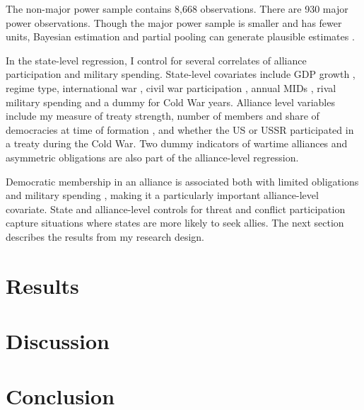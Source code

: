\documentclass[12pt]{article}
\begin{document}
The non-major power sample contains 8,668 observations. 
There are 930 major power observations. 
Though the major power sample is smaller and has fewer units, Bayesian estimation and partial pooling can generate plausible estimates \citep{Stegmueller2013}. 


In the state-level regression, I control for several correlates of alliance participation and military spending. 
State-level covariates include GDP growth \citep{Boltetal2018}, regime type, international war \citep{Reiteretal2016}, civil war participation \citep{SarkeesWayman2010}, annual MIDs \citep{Gibleretal2016}, rival military spending \citep{ThompsonDreyer2012} and a dummy for Cold War years.
Alliance level variables include my measure of treaty strength, number of members and share of democracies at time of formation \citep{Chibaetal2015}, and whether the US or USSR participated in a treaty during the Cold War. 
Two dummy indicators of wartime alliances and asymmetric obligations \citep{Leedsetal2002} are also part of the alliance-level regression. 


Democratic membership in an alliance is associated both with limited obligations \citep{Chibaetal2015} and military spending \citep{DigiuseppePoast2016}, making it a particularly important alliance-level covariate.  
State and alliance-level controls for threat and conflict participation capture situations where states are more likely to seek allies. 
The next section describes the results from my research design. 

\section{Results}






\section{Discussion}



\section{Conclusion}



%  
 
\end{document}
